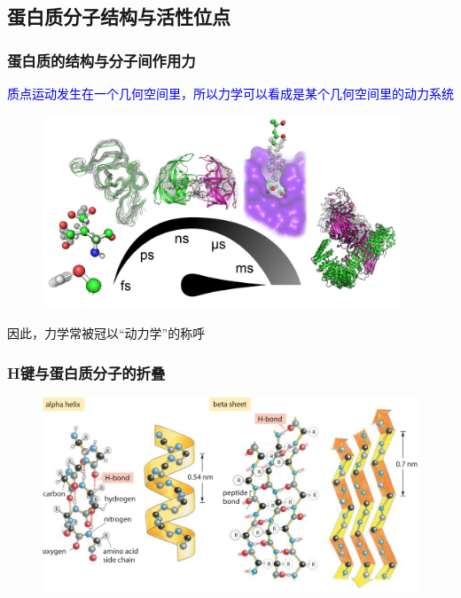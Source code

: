 \subsection{蛋白质分子结构与活性位点}
\frame
{
	\frametitle{蛋白质的结构与分子间作用力}
\textcolor{blue}{质点运动发生在一个几何空间里，所以力学可以看成是某个几何空间里的动力系统}
\begin{figure}[h!]
\centering
\vspace{-40.5pt}
\includegraphics[height=0.65\textwidth,width=0.95\textwidth,viewport=0 0 470 290,clip]{Figures/Protein-structure.png}
\label{Protein-structure-1}
\end{figure}
因此，力学常被冠以``动力学''的称呼
}

\frame
{
	\frametitle{\textrm{H}键与蛋白质分子的折叠}
\begin{figure}[h!]
\centering
\vspace{-5.5pt}
\includegraphics[height=0.57\textwidth,width=1.0\textwidth,viewport=0 0 1100 600,clip]{Figures/310-f1-AlphaBeta-1.png}
\label{Protein-structure-2}
\end{figure}
}

